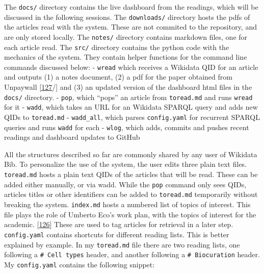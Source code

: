 The \texttt{docs/} directory contains the live dashboard from the readings, which will be discussed in the following sessions.
The \texttt{downloads/} directory hosts the pdfs of the articles read with the system.
These are not commited to the repository, and are only stored locally.
The \texttt{notes/} directory contains markdown files, one for each article read.
The \texttt{src/} directory contains the python code with the mechanics of the system.
They contain helper functions for the command line commands discussed below:
- \texttt{wread} which receives a Wikidata QID for an article and outputs (1) a notes document, (2) a pdf for the paper obtained from Unpaywall {[}\protect\hyperlink{ref-15luL9zZC}{127}/{]} and (3) an updated version of the dashboard html files in the \texttt{docs/} directory.
- \texttt{pop}, which ``pops'' an article from \texttt{toread.md} and runs \texttt{wread} for it
- \texttt{wadd}, which takes an URL for an Wikidata SPARQL query and adds new QIDs to \texttt{toread.md}
- \texttt{wadd\_all}, which parses \texttt{config.yaml} for recurrent SPARQL queries and runs \texttt{wadd} for each
- \texttt{wlog}, which adds, commits and pushes recent readings and dashboard updates to GitHub

All the structures described so far are commonly shared by any user of Wikidata Bib.
To personalize the use of the system, the user edits three plain text files.
\texttt{toread.md} hosts a plain text QIDs of the articles that will be read.
These can be added either manually, or via wadd.
While the \texttt{pop} command only sees QIDs, articles titles or other identifiers can be added to \texttt{toread.md} temporarily without breaking the system.
\texttt{index.md} hosts a numbered list of topics of interest.
This file plays the role of Umberto Eco's work plan, with the topics of interest for the academic. {[}\protect\hyperlink{ref-1HBVPtZGp}{126}{]}
These are used to tag articles for retrieval in a later step.
\texttt{config.yaml} contains shortcuts for different reading lists.
This is better explained by example.
In my \texttt{toread.md} file there are two reading lists, one following a \texttt{\#\ Cell\ types} header, and another following a \texttt{\#\ Biocuration} header.
My \texttt{config.yaml} contains the following snippet:

\begin{Shaded}
\begin{Highlighting}[]
\KeywordTok{:}
\AttributeTok{  }\KeywordTok{:}
\AttributeTok{  }\KeywordTok{:}
\end{Highlighting}
\end{Shaded}

